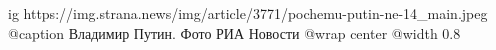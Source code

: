  
 
 
 
 

\ifcmt
  ig https://img.strana.news/img/article/3771/pochemu-putin-ne-14_main.jpeg
  @caption Владимир Путин. Фото РИА Новости 
  @wrap center
  @width 0.8
\fi

